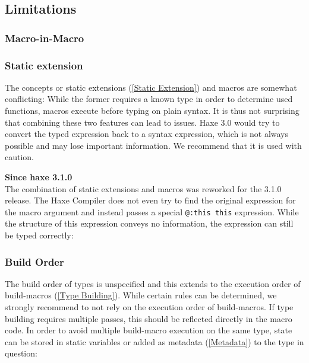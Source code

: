 \documentclass{article}
\newcommand{\expr}[1]{\texttt{#1}}
\newcommand{\tref}[2]{#1 (\ref{#2})}
\newcommand{\since}[1]{\noindent\textbf{Since haxe #1}\\}
\newcommand{\haxe}[2][]{%
}
\begin{document}
\subsection{Limitations}

\subsubsection{Macro-in-Macro}

\subsubsection{Static extension}

The concepts or \tref{static extensions}{Static Extension} and macros are somewhat conflicting: While the former requires a known type in order to determine used functions, macros execute before typing on plain syntax. It is thus not surprising that combining these two features can lead to issues. Haxe 3.0 would try to convert the typed expression back to a syntax expression, which is not always possible and may lose important information. We recommend that it is used with caution.

\since{3.1.0}

The combination of static extensions and macros was reworked for the 3.1.0 release. The Haxe Compiler does not even try to find the original expression for the macro argument and instead passes a special \expr{@:this this} expression. While the structure of this expression conveys no information, the expression can still be typed correctly:

\haxe{assets/MacroStaticExtension.hx}



\subsubsection{Build Order}
\label{Build Order}

The build order of types is unspecified and this extends to the execution order of \tref{build-macros}{Type Building}. While certain rules can be determined, we strongly recommend to not rely on the execution order of build-macros. If type building requires multiple passes, this should be reflected directly in the macro code. In order to avoid multiple build-macro execution on the same type, state can be stored in static variables or added as \tref{metadata}{Metadata} to the type in question:

\haxe{assets/MacroBuildOrder.hx}
\end{document}
